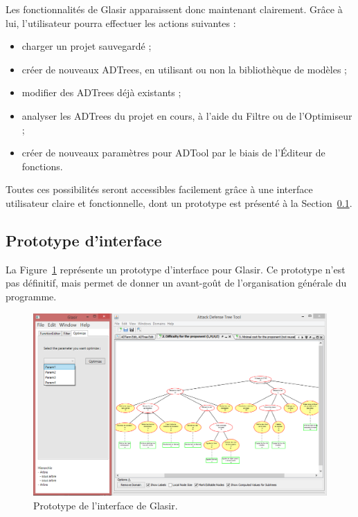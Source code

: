     Les fonctionnalités de Glasir apparaissent donc maintenant clairement. Grâce à lui, l'utilisateur pourra effectuer les actions suivantes : 

    \begin{itemize}
    \item charger un projet sauvegardé ;
    \item créer de nouveaux ADTrees, en utilisant ou non la bibliothèque de modèles ;
    \item modifier des ADTrees déjà existants ;
    \item analyser les ADTrees du projet en cours, à l'aide du Filtre ou de l'Optimiseur ;
    \item créer de nouveaux paramètres pour ADTool par le biais de l'Éditeur de fonctions.
    \end{itemize}  

    Toutes ces possibilités seront accessibles facilement grâce à une interface utilisateur claire et fonctionnelle, dont un prototype est présenté à la {\sc Section}~\ref{sec:interface}.      
    
    \subsection{Prototype d'interface}
    \label{sec:interface}
    
    La {\sc Figure}~\ref{fig:interface} représente un prototype d'interface pour Glasir. Ce prototype n'est pas définitif, mais permet de donner un avant-goût de l'organisation générale du programme. 

    \begin{figure}[h!]
        \centering
        \includegraphics[height=0.72\textwidth]{figure/interface.png}
        \caption{Prototype de l'interface de Glasir.}
        \label{fig:interface}
    \end{figure}
    
